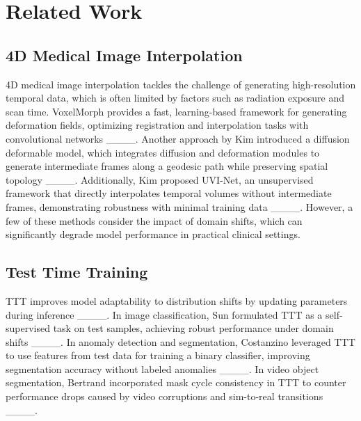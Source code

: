 \section{Related Work}
\subsection{4D Medical Image Interpolation}
4D medical image interpolation tackles the challenge of generating high-resolution temporal data, which is often limited by factors such as radiation exposure and scan time. VoxelMorph provides a fast, learning-based framework for generating deformation fields, optimizing registration and interpolation tasks with convolutional networks ____. Another approach by Kim introduced a diffusion deformable model, which integrates diffusion and deformation modules to generate intermediate frames along a geodesic path while preserving spatial topology ____. Additionally, Kim proposed UVI-Net, an unsupervised framework that directly interpolates temporal volumes without intermediate frames, demonstrating robustness with minimal training data ____. However, a few of these methods consider the impact of domain shifts, which can significantly degrade model performance in practical clinical settings.

\subsection{Test Time Training}
TTT improves model adaptability to distribution shifts by updating parameters during inference ____. In image classification, Sun formulated TTT as a self-supervised task on test samples, achieving robust performance under domain shifts ____. In anomaly detection and segmentation, Costanzino leveraged TTT to use features from test data for training a binary classifier, improving segmentation accuracy without labeled anomalies ____. In video object segmentation, Bertrand incorporated mask cycle consistency in TTT to counter performance drops caused by video corruptions and sim-to-real transitions ____.
   
